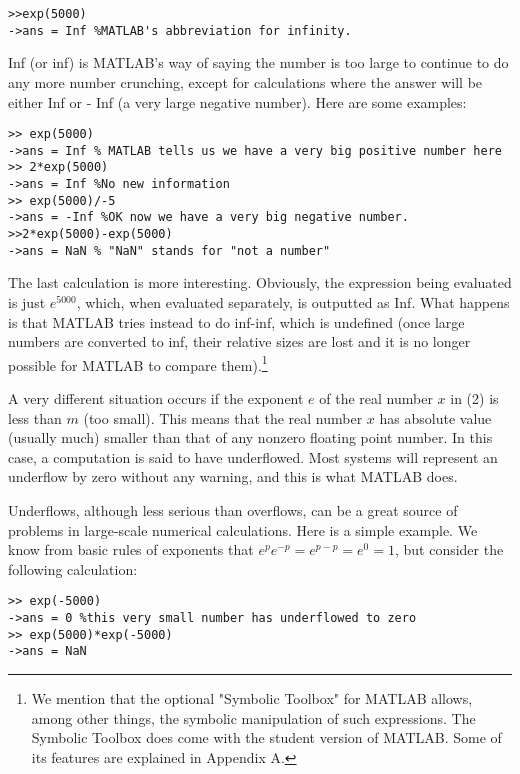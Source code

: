 \documentclass[../main.tex]{subfiles}
\begin{document}
\begin{verbatim}
>>exp(5000)
->ans = Inf %MATLAB's abbreviation for infinity.
\end{verbatim}

Inf (or inf) is MATLAB's way of saying the number is too large to continue to do any more number crunching, except for calculations where the answer will be either Inf or - Inf (a very large negative number). Here are some examples:

\begin{verbatim}
>> exp(5000)
->ans = Inf % MATLAB tells us we have a very big positive number here
>> 2*exp(5000)
->ans = Inf %No new information
>> exp(5000)/-5
->ans = -Inf %OK now we have a very big negative number.
>>2*exp(5000)-exp(5000)
->ans = NaN % "NaN" stands for "not a number" 
\end{verbatim}

The last calculation is more interesting. Obviously, the expression being evaluated is just $e^{5000}$, which, when evaluated separately, is outputted as Inf. What happens is that MATLAB tries instead to do inf-inf, which is undefined (once large numbers are converted to inf, their relative sizes are lost and it is no longer possible for MATLAB to compare them).\footnote{We mention that the optional "Symbolic Toolbox" for MATLAB allows, among other things, the symbolic manipulation of such expressions. The Symbolic Toolbox does come with the student version of MATLAB. Some of its features are explained in Appendix A. }

A very different situation occurs if the exponent $e$ of the real number $x$ in (2) is less than $m$ (too small). This means that the real number $x$ has absolute value (usually much) smaller than that of any nonzero floating point number. In this case, a computation is said to have underflowed. Most systems will represent an underflow by zero without any warning, and this is what MATLAB does.

Underflows, although less serious than overflows, can be a great source of problems in large-scale numerical calculations. Here is a simple example. We know from basic rules of exponents that $e^{p} e^{-p}=e^{p-p}=e^{0}=1$, but consider the following calculation:

\begin{verbatim}
>> exp(-5000)
->ans = 0 %this very small number has underflowed to zero
>> exp(5000)*exp(-5000)
->ans = NaN 

\end{verbatim}
\end{document}
